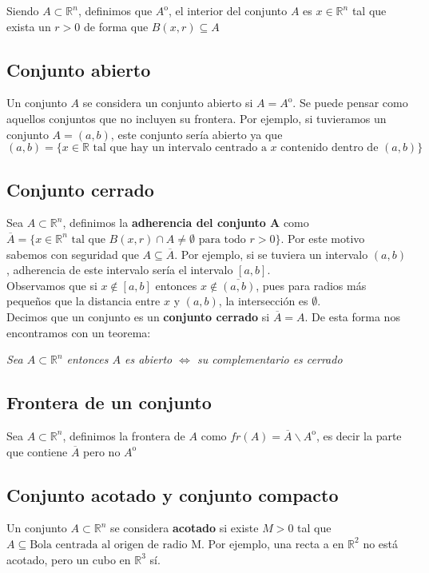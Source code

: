\documentclass[11pt]{article}
\newcommand{\R}{\mathbb{R}}
\theoremstyle{plain}
\begin{document}
            Siendo $A \subset \R^n$, definimos que $A^{\mathrm{o}}$, el interior del conjunto $A$ es $x\in \R^n$ tal que exista un $r>0$ de forma que $B(x,r) \subseteq A$
        \subsection{Conjunto abierto} %
        \label{sub:conjunto_abierto}
            Un conjunto $A$ se considera un conjunto abierto si $ A = A^{\mathrm{o}}$. Se puede pensar como aquellos conjuntos que no incluyen su frontera. Por ejemplo, si tuvieramos un conjunto $A = (a,b)$, este conjunto sería abierto ya que $(a,b) = \{ x \in \R \text{ tal que hay un intervalo centrado a $x$ contenido dentro de $(a,b)$}\}$  
        \subsection{Conjunto cerrado} %
        \label{sub:conjunto_cerrado}
            Sea $A \subset \R ^n$, definimos la \textbf{adherencia del conjunto A} como $\overline{A} = \{x\in \R^n \text{ tal que } B(x,r)\cap A \ne \emptyset \text{ para todo } r>0\}$. Por este motivo sabemos con seguridad que $A \subseteq \overline{A}$. Por ejemplo, si se tuviera un intervalo $(a,b)$, adherencia de este intervalo sería el intervalo $[a,b]$.\\

            Observamos que si $x \notin [a,b]$ entonces $x \notin \overline{(a,b)}$, pues para radios más pequeños que la distancia entre $x$ y $(a,b)$, la intersección es $\emptyset$.\\

            Decimos que un conjunto es un \textbf{conjunto cerrado} si $\overline{A} = A$. De esta forma nos encontramos con un teorema:
            \begin{center}
                \textit{Sea $A \subset \R^n$ entonces $A$ es abierto $\Leftrightarrow$ su complementario es cerrado}
            \end{center}
        \subsection{Frontera de un conjunto} %
        \label{sub:frontera_de_un_conjunto}
            Sea $A \subset \R^n$, definimos la frontera de $A$ como $fr(A) = \overline{A} \backslash  A^{\mathrm{o}}$, es decir la parte que contiene $\overline{A}$ pero no $A^{\mathrm{o}}$
        \subsection{Conjunto acotado y conjunto compacto} %
        \label{sub:conjunto_acotado_y_conjunto_compacto}
            Un conjunto $A \subset \R^n$ se considera \textbf{acotado} si existe $M>0$ tal que $A\subseteq \text{Bola centrada al origen de radio M}$. Por ejemplo, una recta a en $\R^2$ no está acotado, pero un cubo en $\R^3$ sí.
\end{document}
